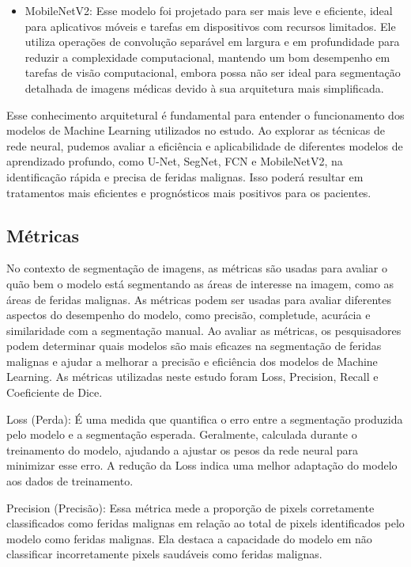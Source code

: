 \begin{itemize}
    \item \ac{MobileNetV2}: Esse modelo foi projetado para ser mais leve e eficiente, ideal para aplicativos móveis e tarefas em dispositivos com recursos limitados. Ele utiliza operações de convolução separável em largura e em profundidade para reduzir a complexidade computacional, mantendo um bom desempenho em tarefas de visão computacional, embora possa não ser ideal para segmentação detalhada de imagens médicas devido à sua arquitetura mais simplificada.

\end{itemize}

Esse conhecimento arquitetural é fundamental para entender o funcionamento dos modelos de Machine Learning utilizados no estudo. Ao explorar as técnicas de rede neural, pudemos avaliar a eficiência e aplicabilidade de diferentes modelos de aprendizado profundo, como \ac{U-Net}, \ac{SegNet}, \ac{FCN} e \ac{MobileNetV2}, na identificação rápida e precisa de feridas malignas. Isso poderá resultar em tratamentos mais eficientes e prognósticos mais positivos para os pacientes.

\subsection{Métricas}

No contexto de segmentação de imagens, as métricas são usadas para avaliar o quão bem o modelo está segmentando as áreas de interesse na imagem, como as áreas de feridas malignas. As métricas podem ser usadas para avaliar diferentes aspectos do desempenho do modelo, como precisão, completude, acurácia e similaridade com a segmentação manual. Ao avaliar as métricas, os pesquisadores podem determinar quais modelos são mais eficazes na segmentação de feridas malignas e ajudar a melhorar a precisão e eficiência dos modelos de Machine Learning. As métricas utilizadas neste estudo foram Loss, Precision, Recall e Coeficiente de Dice.   

Loss (Perda): É uma medida que quantifica o erro entre a segmentação produzida pelo modelo e a segmentação esperada. Geralmente,  calculada durante o treinamento do modelo, ajudando a ajustar os pesos da rede neural para minimizar esse erro. A redução da Loss indica uma melhor adaptação do modelo aos dados de treinamento.

Precision (Precisão): Essa métrica mede a proporção de pixels corretamente classificados como feridas malignas em relação ao total de pixels identificados pelo modelo como feridas malignas. Ela destaca a capacidade do modelo em não classificar incorretamente pixels saudáveis como feridas malignas.

